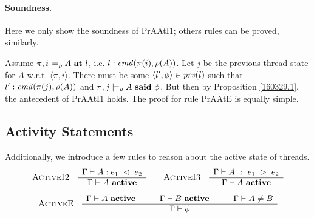 \paragraph{Soundness.} Here we only show the soundness of {\sc PrAAtI1}; others rules can be  proved, similarly.  

Assume $\pi,i\models_\rho A\ \At\ \Label$, i.e. $l: \mathit{cmd}(\pi(i),\rho(A))$. Let $j$ be the previous thread state
for $A$ w.r.t. $\langle\pi,i\rangle$. There must be some $\langle l',\phi\rangle\in \mathit{prv}(l)$ such that $l':\mathit{cmd}(\pi(j),\rho(A))$ and
$\pi,j\models_\rho A\ \mathbf{said}\ \phi$. But then by Proposition \ref{160329.1},  the antecedent of {\sc PrAAtI1} holds.
The proof for rule {\sc PrAAtE} is equally simple.
%
\subsection{Activity Statements}
Additionally, we introduce a few rules to reason about the active state of threads.
%
\[
\begin{array}{ccc}
\begin{array}{cc}
\mbox{\sc ActiveI2}
&
\begin{array}{c}
\Gamma \vdash A: e_1\ \lhd\ e_2 \\ \hline
\Gamma \vdash A\ \mathbf{active}
\end{array}
\end{array}
&
\begin{array}{cc}
\mbox{\sc ActiveI3}
&
\begin{array}{c}
\Gamma \vdash A\ :\ e_1\ \rhd\ e_2 \\ \hline
\Gamma \vdash A\ \mathbf{active}
\end{array}
\end{array}
\end{array}
\]
\[
\begin{array}{cc}
\mbox{\sc ActiveE}
&
\begin{array}{c}
\Gamma \vdash A\ \mathbf{active} \hspace*{1cm}
\Gamma \vdash B\ \mathbf{active} \hspace*{1cm} 
\Gamma \vdash  A \neq B \\ \hline
\Gamma \vdash \phi
\end{array}
\end{array}
\]
%
 
